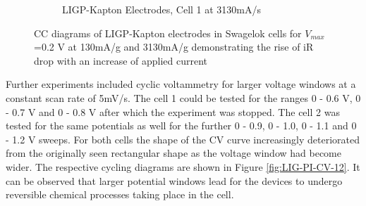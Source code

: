 \begin{figure}[H]
\begin{subfigure}{0.49\textwidth}
\captionsetup{width=0.9\linewidth}
\caption{LIGP-Kapton Electrodes, Cell 1 at 3130\:mA/s}
\label{fig:LIGP-PI-cell2-CC-02-iR-high}
\end{subfigure}
\medskip
\caption{CC diagrams of LIGP-Kapton electrodes in Swagelok cells for $V_{max}$=0.2 V at 130\:mA/g and 3130\:mA/g demonstrating the rise of iR drop with an increase of applied current}
\label{fig:LIGP-PI-CC-02-iR-drop}
\end{figure}


Further experiments included cyclic voltammetry for larger voltage windows at a constant scan rate of 5mV/s. The cell 1 could be tested for the ranges 0 - 0.6 V, 0 - 0.7 V and 0 - 0.8 V after which the experiment was stopped. The cell 2 was tested for the same potentials as well for the further 0 - 0.9, 0 - 1.0, 0 - 1.1 and 0 - 1.2 V sweeps. For both cells the shape of the CV curve increasingly deteriorated from the originally seen rectangular shape as the voltage window had become wider. The respective cycling diagrams are shown in Figure \ref{fig:LIG-PI-CV-12}. It can be observed that larger potential windows lead for the devices to undergo reversible chemical processes taking place in the cell.

